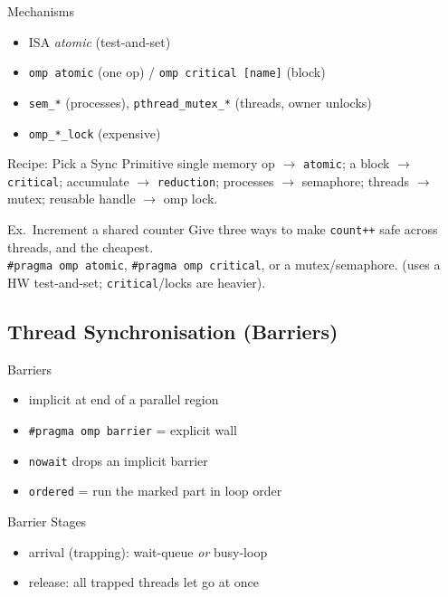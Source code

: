 \begin{concept}{Mechanisms}
    \begin{itemize}
        \item ISA \emph{atomic} (test-and-set)
        \item \texttt{omp atomic} (one op) / \texttt{omp critical [name]} (block)
        \item \texttt{sem\_*} (processes), \texttt{pthread\_mutex\_*} (threads, owner unlocks)
        \item \texttt{omp\_*\_lock} (expensive)
    \end{itemize}
\end{concept}

\begin{KR}{Recipe: Pick a Sync Primitive}
    single memory op $\to$ \texttt{atomic}; a block $\to$ \texttt{critical}; accumulate $\to$ \texttt{reduction}; processes $\to$ semaphore; threads $\to$ mutex; reusable handle $\to$ omp lock.
\end{KR}

\begin{example2}{Ex.\ Increment a shared counter}
    Give three ways to make \texttt{count++} safe across threads, and the cheapest.
     \\ 
    \texttt{\#pragma omp atomic}, \texttt{\#pragma omp critical}, or a mutex/semaphore.  (uses a HW test-and-set; \texttt{critical}/locks are heavier).
\end{example2}

\subsection{Thread Synchronisation (Barriers)}


\begin{concept}{Barriers}
    \begin{itemize}
        \item implicit at end of a parallel region
        \item \texttt{\#pragma omp barrier} = explicit wall
        \item \texttt{nowait} drops an implicit barrier
        \item \texttt{ordered} = run the marked part in loop order
    \end{itemize}
\end{concept}

\begin{definition}{Barrier Stages}
    \begin{itemize}
        \item arrival (trapping): wait-queue \emph{or} busy-loop
        \item release: all trapped threads let go at once
    \end{itemize}
\end{definition}


